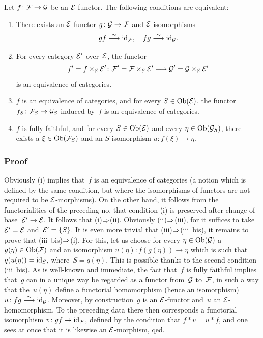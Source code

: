 \begin{proposition}
\label{VI.4.2} Let $f \colon \cal{F} \to \cal{G}$ be an
$\cal{E}$-functor. The following conditions are equivalent:
\begin{enumerate}
\item[(i)] There exists an $\cal{E}$-functor $g \colon \cal{G} \to
\cal{F}$ and $\cal{E}$-isomorphisms
$$
gf \isomto \id_{\cal{F}}, \quad fg \isomto \id_{\cal{G}}.
$$
\item[(ii)] For every category $\cal{E}'$ over~$\cal{E}$, the
functor
$$
f' = f \times_{\cal{E}} \cal{E}' \colon \cal{F}' = \cal{F}
\times_{\cal{E}} \cal{E}' \to \cal{G}'=\cal{G} \times_{\cal{E}}
\cal{E}'
$$
is an equivalence of categories.
\item[(iii)]
$f$ is an equivalence of categories, and for every $S \in
\Ob(\cal{E})$, the functor $f_S \colon \cal{F}_S \to \cal{G}_S$ induced
by~$f$ is an equivalence of categories.
\item[(iii~bis)] $f$ is fully faithful, and for every $S \in
\Ob(\cal{E})$ and every
$\eta\in\Ob(\cal{G}_S)$,
there exists a $\xi \in \Ob(\cal{F}_S)$ and an $S$-isomorphism
$u \colon f(\xi) \to \eta$.
\end{enumerate}
\end{proposition}

\subsubsection*{Proof} Obviously (i) implies that~$f$ is an
equivalence of categories (a notion which is defined by the
same condition, but where the isomorphisms of functors are
not required to be $\cal{E}$-morphisms). On the other hand,
it follows from the functorialities of the preceding no.
that condition (i) is preserved after change of
base~$\cal{E}'\to\cal{E}$. It follows that (i)$\To$(ii).
Obviously (ii)$\To$(iii), for it suffices to take $\cal{E}'
= \cal{E}$ and~$\cal{E}'=\{S\}$. It is even more trivial that
(iii)$\To$(iii~bis), it remains to prove that (iii~bis)$\To$(i). For this, let us choose for every $\eta \in
\Ob(\cal{G})$ a $g(\eta) \in \Ob(\cal{F})$ and an isomorphism
$u(\eta)\colon f(g(\eta))\to\eta$ which is such that~$q(u(\eta)) =
\id_S$, where~$S=q(\eta)$. This is possible thanks to the
second condition (iii~bis). As is well-known and immediate,
the fact that~$f$ is fully faithful implies that~$g$ can in a
unique way be regarded as a functor
from~$\cal{G}$ to~$\cal{F}$, in such a way that the~$u(\eta)$
define a functorial homomorphism (hence an isomorphism)
$u\colon fg \isomto \id_{\cal{G}}$. Moreover, by construction~$g$ is
an $\cal{E}$-functor and~$u$ an $\cal{E}$-homomorphism. To the
preceding data there then corresponds a functorial isomorphism
$v\colon gf \to \id_{\cal{F}}$, defined by the condition
that $f*v=u*f$, and one sees at once that it is likewise an
$\cal{E}$-morphism, qed.

